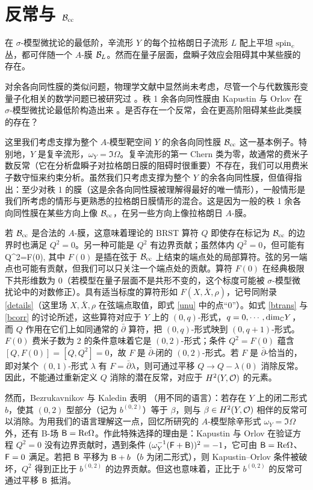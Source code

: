 \section{反常与 ${\mathcal B}_{\mathrm{cc}}$}\label{anombcc}

在 $\sigma$-模型微扰论的最低阶，辛流形 $Y$ 的每个拉格朗日子流形 $L$ 配上平坦 ${\mathrm{spin}_c}$ 丛，都可伴随一个 $A$-膜 ${\mathcal B}_L$。然而在量子层面，盘瞬子效应会阻碍其中某些膜的存在。

对余各向同性膜的类似问题，物理学文献中显然尚未考虑，尽管一个与代数簇形变量子化相关的数学问题已被研究过 \cite{bezk}。秩 1 余各向同性膜由 Kapustin 与 Orlov 在 $\sigma$-模型微扰论最低阶构造出来 \cite{KO}。是否存在一个反常，会在更高阶阻碍某些此类膜的存在？

这里我们考虑支撑为整个 $A$-模型靶空间 $Y$ 的余各向同性膜 ${\mathcal B}_{\mathrm{cc}}$ 这一基本例子。特别地，$Y$ 是复辛流形，$\omega_Y=\Im\Omega$。复辛流形的第一 Chern 类为零，故通常的费米子数反常（它在分析盘瞬子对拉格朗日膜的阻碍时很重要）不存在，我们可以用费米子数守恒来约束分析。虽然我们只考虑支撑为整个 $Y$ 的余各向同性膜，但值得指出：至少对秩 1 的膜（这是余各向同性膜被理解得最好的唯一情形），一般情形是我们所考虑的情形与更熟悉的拉格朗日膜情形的混合。这是因为一般的秩 1 余各向同性膜在某些方向上像 ${\mathcal B}_{\mathrm{cc}}$，在另一些方向上像拉格朗日 $A$-膜。

若 ${\mathcal B}_{\mathrm{cc}}$ 是合法的 $A$-膜，这意味着理论的 BRST 算符 $Q$ 即使存在标记为 ${\mathcal B}_{\mathrm{cc}}$ 的边界时也满足 $Q^2=0$。另一种可能是 $Q^2$ 有边界贡献；虽然体内 $Q^2=0$，但可能有
\be\label{unu}Q^2=F(0),\ee
其中 $F(0)$ 是插在弦于 ${\mathcal B}_{\mathrm{cc}}$ 上结束的端点处的局部算符。弦的另一端点也可能有贡献，但我们可以只关注一个端点处的贡献。算符 $F(0)$ 在经典极限下共形维数为 0（若模型在量子层面不是共形不变的，这个标度可能被 $\sigma$-模型微扰论中的对数修正）。具有适当标度的算符形如 $F(X,\bar X,\rho)$，记号同附录 \ref{details}（这里场 $X,\bar X,\rho$ 在弦端点取值，即式 \eqref{unu} 中的点“0”）。如式 \eqref{btrans} 与 \eqref{bcorr} 的讨论所述，这些算符对应于 $Y$ 上的 $(0,q)$-形式，$q=0,\cdots,{\mathrm{dim}}_{\mathbb C} Y$，而 $Q$ 作用在它们上如同通常的 $\bar\partial$ 算符，把 $(0,q)$-形式映到 $(0,q+1)$-形式。$F(0)$ 费米子数为 2 的条件意味着它是 $(0,2)$-形式；条件 $Q^2=F(0)$ 蕴含 $[Q,F(0)]=[Q,Q^2]=0$，故 $F$ 是 $\bar\partial$-闭的 $(0,2)$-形式。若 $F$ 是 $\bar\partial$-恰当的，即对某个 $(0,1)$-形式 $\lambda$ 有 $F=\bar\partial\lambda$，则可通过平移 $Q\to Q-\lambda(0)$ 消除反常。因此，不能通过重新定义 $Q$ 消除的潜在反常，对应于 $H^2(Y,{\mathcal O})$ 的元素。

然而，Bezrukavnikov 与 Kaledin 表明 \cite{bezk}（用不同的语言）：若存在 $Y$ 上的闭二形式 $b$，使其 $(0,2)$ 型部分（记为 $b^{(0,2)}$）等于 $\beta$，则与 $\beta\in H^2(Y,{\mathcal O})$ 相伴的反常可以消除。为用我们的语言理解这一点，回忆所研究的 $A$-模型除辛形式 $\omega_Y=\Im\Omega$ 外，还有 B-场 ${\sf B}={\mathrm{Re}}\Omega$。作此特殊选择的理由是：Kapustin 与 Orlov \cite{KO} 在验证方程 $Q^2=0$ 没有边界贡献时，遇到条件 $(\omega_Y^{-1}({\sf F}+{\sf B}))^2=-1$，它可由 ${\sf B}={\mathrm{Re}}\Omega$、${\sf F}=0$ 满足。若把 ${\sf B}$ 平移为 ${\sf B}+b$（$b$ 为闭二形式），则 Kapustin--Orlov 条件被破坏，$Q^2$ 得到正比于 $b^{(0,2)}$ 的边界贡献。但这也意味着，正比于 $b^{(0,2)}$ 的反常可通过平移 ${\sf B}$ 抵消。


